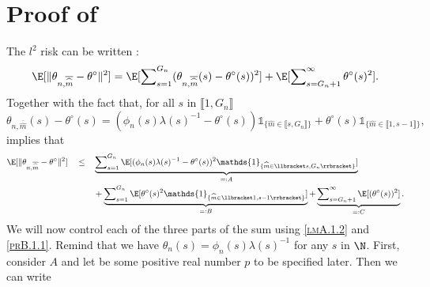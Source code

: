 \section{Proof of }
The $l^{2}$ risk can be written :
\[\E[\Vert \theta_{n, \overline{\widehat{m}}} - \theta^{\circ} \Vert^{2}] = \E[\sum\nolimits_{s = 1}^{G_{n}} ( \theta_{n, \overline{\widehat{m}}}(s) - \theta^{\circ}(s) )^{2}] + \E[\sum\nolimits_{s = G_{n} + 1}^{\infty} \theta^{\circ}(s)^{2}].\]
Together with the fact that, for all $s$ in $\llbracket 1, G_{n} \rrbracket$
\[\theta_{n, \overline{\widehat{m}}}(s) - \theta^{\circ}(s) = (\phi_{n}(s)\lambda(s)^{-1} - \theta^{\circ}(s)) \mathds{1}_{\{\widehat{m} \in \llbracket s, G_{n} \rrbracket\}} + \theta^{\circ}(s) \mathds{1}_{\{\widehat{m} \in \llbracket 1, s-1 \rrbracket\}},\]
implies that
\begin{alignat*}{3}
& \E[\Vert \theta_{n, \overline{\widehat{m}}} - \theta^{\circ} \Vert^{2}] &&\leq&& \underbrace{\sum\nolimits_{s = 1}^{G_{n}}\E[(\phi_{n}(s)\lambda(s)^{-1} - \theta^{\circ}(s))^{2} \mathds{1}_{\{\widehat{m} \in \llbracket s, G_{n} \rrbracket\}}]}_{=: A}\\
& && && + \underbrace{\sum\nolimits_{s = 1}^{G_{n}}\E[\theta^{\circ}(s)^{2} \mathds{1}_{\{\widehat{m} \in \llbracket 1, s-1 \rrbracket\}}]}_{=: B}+ \underbrace{\sum\nolimits_{s = G_{n} + 1}^{\infty}\E[( \theta^{\circ}(s))^{2}]}_{=: C}.
\end{alignat*}
We will now control each of the three parts of the sum using \textsc{\cref{lmA.1.2}} and \textsc{\cref{prB.1.1}}.
Remind that we have $\theta_{n}(s) = \phi_{n}(s)\lambda(s)^{-1}$ for any $s$ in $\N$.
First, consider $A$ and let be some positive real number $p$ to be specified later.
Then we can write

